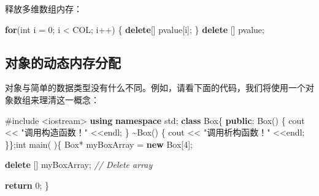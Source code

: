 \documentclass[
]{article}
\newenvironment{Shaded}{}{}
\newcommand{\CommentTok}[1]{\textcolor[rgb]{0.38,0.63,0.69}{\textit{#1}}}
\newcommand{\ControlFlowTok}[1]{\textcolor[rgb]{0.00,0.44,0.13}{\textbf{#1}}}
\newcommand{\DataTypeTok}[1]{\textcolor[rgb]{0.56,0.13,0.00}{#1}}
\newcommand{\DecValTok}[1]{\textcolor[rgb]{0.25,0.63,0.44}{#1}}
\newcommand{\ImportTok}[1]{#1}
\newcommand{\KeywordTok}[1]{\textcolor[rgb]{0.00,0.44,0.13}{\textbf{#1}}}
\newcommand{\NormalTok}[1]{#1}
\newcommand{\OperatorTok}[1]{\textcolor[rgb]{0.40,0.40,0.40}{#1}}
\newcommand{\PreprocessorTok}[1]{\textcolor[rgb]{0.74,0.48,0.00}{#1}}
\newcommand{\StringTok}[1]{\textcolor[rgb]{0.25,0.44,0.63}{#1}}
\begin{document}
释放多维数组内存：

\begin{Shaded}
\begin{Highlighting}[]
\ControlFlowTok{for}\OperatorTok{(}\DataTypeTok{int}\NormalTok{ i }\OperatorTok{=} \DecValTok{0}\OperatorTok{;}\NormalTok{ i }\OperatorTok{\textless{}}\NormalTok{ COL}\OperatorTok{;}\NormalTok{ i}\OperatorTok{++)} \OperatorTok{\{}
    \KeywordTok{delete}\OperatorTok{[]}\NormalTok{ pvalue}\OperatorTok{[}\NormalTok{i}\OperatorTok{];}
\OperatorTok{\}}
    \KeywordTok{delete} \OperatorTok{[]}\NormalTok{ pvalue}\OperatorTok{;}
\end{Highlighting}
\end{Shaded}

\hypertarget{ux5bf9ux8c61ux7684ux52a8ux6001ux5185ux5b58ux5206ux914d}{%
\subsection{对象的动态内存分配}\label{ux5bf9ux8c61ux7684ux52a8ux6001ux5185ux5b58ux5206ux914d}}

对象与简单的数据类型没有什么不同。例如，请看下面的代码，我们将使用一个对象数组来理清这一概念：

\begin{Shaded}
\begin{Highlighting}[]
\PreprocessorTok{\#include }\ImportTok{\textless{}iostream\textgreater{}}
\KeywordTok{using} \KeywordTok{namespace}\NormalTok{ std}\OperatorTok{;}
\KeywordTok{class}\NormalTok{ Box}\OperatorTok{\{}
   \KeywordTok{public}\OperatorTok{:}
\NormalTok{      Box}\OperatorTok{()} \OperatorTok{\{} 
\NormalTok{         cout }\OperatorTok{\textless{}\textless{}} \StringTok{"调用构造函数！"} \OperatorTok{\textless{}\textless{}}\NormalTok{endl}\OperatorTok{;} 
      \OperatorTok{\}}
      \OperatorTok{\textasciitilde{}}\NormalTok{Box}\OperatorTok{()} \OperatorTok{\{} 
\NormalTok{         cout }\OperatorTok{\textless{}\textless{}} \StringTok{"调用析构函数！"} \OperatorTok{\textless{}\textless{}}\NormalTok{endl}\OperatorTok{;} 
      \OperatorTok{\}\};}\DataTypeTok{int}\NormalTok{ main}\OperatorTok{(} \OperatorTok{)\{}
\NormalTok{   Box}\OperatorTok{*}\NormalTok{ myBoxArray }\OperatorTok{=} \KeywordTok{new}\NormalTok{ Box}\OperatorTok{[}\DecValTok{4}\OperatorTok{];}

   \KeywordTok{delete} \OperatorTok{[]}\NormalTok{ myBoxArray}\OperatorTok{;} \CommentTok{// Delete array}

   \ControlFlowTok{return} \DecValTok{0}\OperatorTok{;}
\OperatorTok{\}}
\end{Highlighting}
\end{Shaded}
\end{document}

